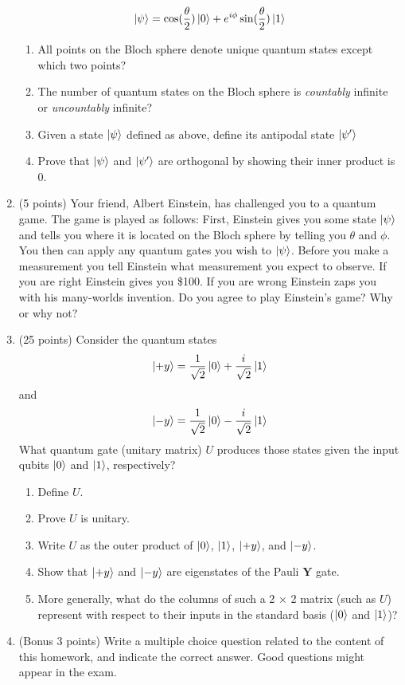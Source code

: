 \documentclass[12pt]{article}
\begin{document}
\begin{enumerate}[font=\bfseries]
    \[\ket{\psi} = \cos(\frac{\theta}{2})\ket{0}
    + e^{i\phi}\sin(\frac{\theta}{2})\ket{1}\]
    \begin{enumerate}
        \item All points on the Bloch sphere denote unique quantum states except which two points?
        \item The number of quantum states on the Bloch sphere is \emph{countably} infinite or \emph{uncountably} infinite?
        \item Given a state $\ket{\psi}$ defined as above, define its antipodal state $\ket{\psi'}$
        \item Prove that $\ket{\psi}$ and $\ket{\psi'}$ are orthogonal by showing their inner product is 0.
    \end{enumerate}
    \item (5 points) Your friend, Albert Einstein, has challenged you to a quantum game. The game is played as follows: First, Einstein gives you some state $\ket{\psi}$ and tells you where it is located on the Bloch sphere by telling you $\theta$ and $\phi$. You then can apply any quantum gates you wish to $\ket{\psi}$. Before you make a measurement you tell Einstein what measurement you expect to observe. If you are right Einstein gives you \$100. If you are wrong Einstein zaps you with his many-worlds invention. Do you agree to play Einstein's game? Why or why not?
    \item (25 points) Consider the quantum states
        \[\ket{+y} = \frac{1}{\sqrt{2}}\ket{0} + \frac{i}{\sqrt{2}}\ket{1}\]
        and
        \[\ket{-y} = \frac{1}{\sqrt{2}}\ket{0} - \frac{i}{\sqrt{2}}\ket{1}\]
        What quantum gate (unitary matrix) $U$ produces those states given the input qubits $\ket{0}$ and $\ket{1}$, respectively?
        \begin{enumerate}
            \item Define $U$.
            \item Prove $U$ is unitary.
            \item Write $U$ as the outer product of $\ket{0}$, $\ket{1}$, $\ket{+y}$, and $\ket{-y}$.
            \item Show that $\ket{+y}$ and $\ket{-y}$ are eigenstates of the Pauli $\mathbf{Y}$ gate.
            \item More generally, what do the columns of such a 2 × 2 matrix (such as $U$) represent with respect to their inputs in the standard basis ($\ket{0}$ and $\ket{1}$)?
        \end{enumerate}
    \item (Bonus 3 points) Write a multiple choice question related to the content of this homework, and indicate the correct answer. Good questions might appear in the exam.
\end{enumerate}
\end{document}

